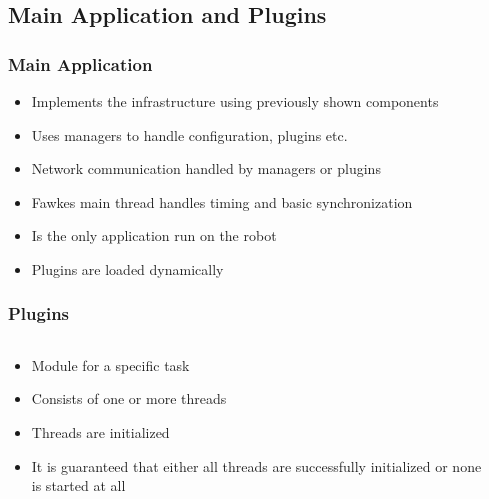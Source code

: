 \subsection{Main Application and Plugins}
\begin{frame}
  \frametitle{Main Application}
  \begin{itemize}
  \item Implements the infrastructure using previously shown components
  \item Uses managers to handle configuration, plugins etc.
  \item Network communication handled by managers or plugins
  \item Fawkes main thread handles timing and basic synchronization
  \item Is the only application run on the robot
  \item Plugins are loaded dynamically
  \end{itemize}
\end{frame}

\begin{frame}
  \frametitle{Plugins}
  \begin{columns}
    \begin{column}{6cm}
      \begin{itemize}
      \item Module for a specific task
      \item Consists of one or more threads
      \item Threads are initialized
      \item It is guaranteed that either all threads are successfully initialized
        or none is started at all
      \end{itemize}
    \end{column}
    \begin{column}{4cm}
      \begin{center}
      \end{center}
    \end{column}
  \end{columns}
\end{frame}

